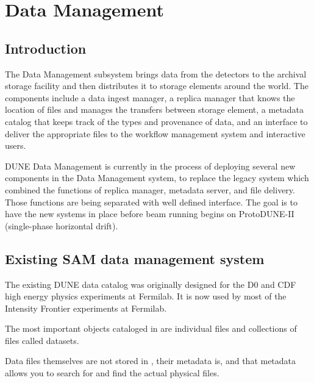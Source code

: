 \documentclass[../main-v1.tex]{subfiles}
\begin{document}
\chapter{Data Management  }
\label{ch:datamgmt}

\section{Introduction}
\label{sec:datamgmt:xyz}  %

The Data Management subsystem brings data from the detectors to the archival storage facility 
and then distributes it to storage elements around the world.  The components include a data ingest manager, a
replica manager that knows the location of files and manages the transfers between storage element, a metadata 
catalog that keeps track of the types and provenance of data, and an interface to deliver the appropriate files 
to the workflow management system and interactive users.

DUNE Data Management is currently in the process of deploying several new components in the Data Management
system, to replace the legacy \cite{Illingworth:2014mba} system which combined the functions of replica manager, metadata server, 
and file delivery.  Those functions are being separated with well defined   interface.  The goal is to have the new systems in place before beam running begins on ProtoDUNE-II
(single-phase horizontal drift).  


\label{ch:sam:catalog}

\section{Existing SAM data management system}

The existing DUNE data catalog  was originally designed for the D0 and CDF high energy physics experiments at Fermilab.  It is now used by most of the Intensity Frontier experiments at Fermilab. 

The most important objects cataloged in  are individual files and collections of files called
datasets.

Data files themselves are not stored in , their metadata is, and that metadata allows you to search for and find the actual physical files.
\end{document}
